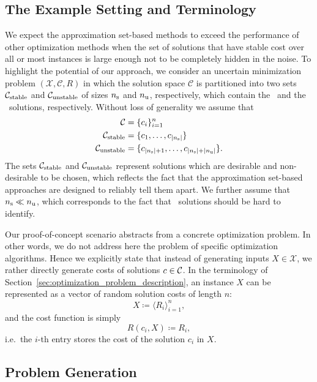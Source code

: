 \subsection{The Example Setting and Terminology}
We expect the approximation set-based methods to exceed the performance of other
optimization methods when the set of solutions that have stable cost over all or
most instances is large enough not to be completely hidden in the noise.
%
To highlight the potential of our approach, we consider an uncertain
minimization problem $(\mathcal{X}, \mathcal{C}, R)$ in which the solution space
$\mathcal{C}$ is partitioned into two sets $\mathcal{C}_\text{stable}$ and $\mathcal{C}_\text{unstable}$ of sizes $n_\text{s}$
and $n_\text{u}$, respectively, which contain the \good\ and the \bad\ solutions,
respectively. Without loss of generality we assume that
\begin{align}
  {\cal C} &= \{c_i\}_{i=1}^n \notag \\
  \mathcal{C}_\text{stable} &= \{c_1,\ldots, c_{|n_\text{s}|}\} \notag \\
  \mathcal{C}_\text{unstable} &= \{c_{|n_\text{s}|+1},\ldots,c_{|n_\text{s}|+|n_\text{u}|}\}.
\end{align}
%
%
The sets $\mathcal{C}_\text{stable}$ and $\mathcal{C}_\text{unstable}$ represent solutions which are desirable and
non-desirable to be chosen, which reflects the fact that the approximation
set-based approaches are designed to reliably tell them apart. We further assume
that $n_\text{s} \ll n_\text{u}$, which corresponds to the fact that \good\ solutions should be hard
to identify.

Our proof-of-concept scenario abstracts from a concrete optimization problem. In
other words, we do not address here the problem of specific optimization
algorithms. Hence we explicitly state that instead of generating inputs $X \in
\mathcal{X}$, we rather directly generate costs of solutions $c \in {\cal C}$.
%
In the terminology of Section~\ref{sec:optimization_problem_description}, an
instance $X$ can be represented as a vector of random solution costs of length
$n$:
\begin{equation}\label{eq:generic_appch_cost_vector}
  X \coloneqq \langle R_i \rangle_{i=1}^{n},
\end{equation} 
and the cost function is simply
\begin{equation}
  R(c_i, X) \coloneqq R_i,
\end{equation} 
i.e.~the $i$-th entry stores the cost of the solution $c_i$ in $X$.

\subsection{Problem Generation}
\label{sec:gen_appch_pg}

